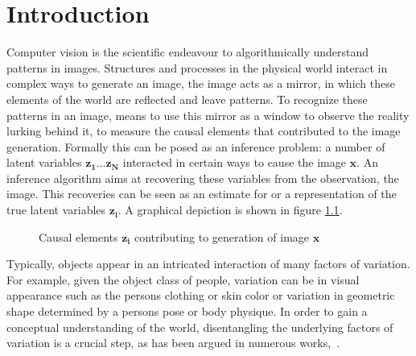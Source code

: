 \chapter{Introduction}

	Computer vision is the scientific endeavour to algorithmically understand patterns in images. Structures and processes in the physical world interact in complex ways to generate an image, the image acts as a mirror, in which these elements of the world are reflected and leave patterns.
	To recognize these patterns in an image, means to use this mirror as a window to observe the reality lurking behind it, \ie to measure the causal elements that contributed to the image generation.
	Formally this can be posed as an inference problem: a number of latent variables $\mathbf{z_1}\ldots\mathbf{z_N}$ interacted in certain ways to cause the image $\mathbf{x}$. An inference algorithm aims at recovering these variables from the observation, \ie the image. This recoveries can be seen as an estimate for or a representation of the true latent variables $\mathbf{z_i}$. A graphical depiction is shown in figure \ref{fig:causal}.
	\begin{figure}[ht]
		\centering
		\caption{Causal elements $\mathbf{z_i}$ contributing to generation of image $\mathbf{x}$}
		\label{fig:causal}
	\end{figure}
	Typically, objects appear in an intricated interaction of many factors of variation.
	For example, given the object class of people, variation can be in visual appearance such as the persons clothing or skin color or variation in geometric shape determined by a persons pose or body physique.
	In order to gain a conceptual understanding of the world, disentangling the underlying factors of variation is a crucial step, as has been argued in numerous works,~\cite{Desjardins2012dr, Bengio2013rep, Chen2016infogan, Higgins2016betavae, Eastwood2018dr}.
